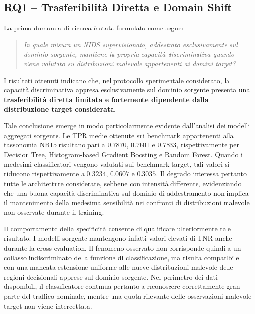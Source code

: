 
\subsection{RQ1 -- Trasferibilità Diretta e Domain Shift}
\label{subsec:conclusioni_rq1}

La prima domanda di ricerca è stata formulata come segue:

\begin{quote}
\textit{In quale misura un NIDS supervisionato, addestrato esclusivamente sul dominio sorgente, mantiene la propria capacità discriminativa quando viene valutato su distribuzioni malevole appartenenti ai domini target?}
\end{quote}

I risultati ottenuti indicano che, nel protocollo sperimentale considerato, la capacità discriminativa appresa esclusivamente sul dominio sorgente presenta una \textbf{trasferibilità diretta limitata e fortemente dipendente dalla distribuzione target considerata}.

Tale conclusione emerge in modo particolarmente evidente dall'analisi dei modelli aggregati sorgente.
Le TPR medie ottenute sui benchmark appartenenti alla tassonomia NB15 risultano pari a $0.7870$, $0.7601$ e $0.7833$, rispettivamente per Decision Tree, Histogram-based Gradient Boosting e Random Forest.
Quando i medesimi classificatori vengono valutati sui benchmark target, tali valori si riducono rispettivamente a $0.3234$, $0.0607$ e $0.3035$.
Il degrado interessa pertanto tutte le architetture considerate, sebbene con intensità differente, evidenziando che una buona capacità discriminativa sul dominio di addestramento non implica il mantenimento della medesima sensibilità nei confronti di distribuzioni malevole non osservate durante il training.

Il comportamento della specificità consente di qualificare ulteriormente tale risultato.
I modelli sorgente mantengono infatti valori elevati di TNR anche durante la cross-evaluation.
Il fenomeno osservato non corrisponde quindi a un collasso indiscriminato della funzione di classificazione, ma risulta compatibile con una mancata estensione uniforme alle nuove distribuzioni malevole delle regioni decisionali apprese sul dominio sorgente.
Nel perimetro dei dati disponibili, il classificatore continua pertanto a riconoscere correttamente gran parte del traffico nominale, mentre una quota rilevante delle osservazioni malevole target non viene intercettata.

